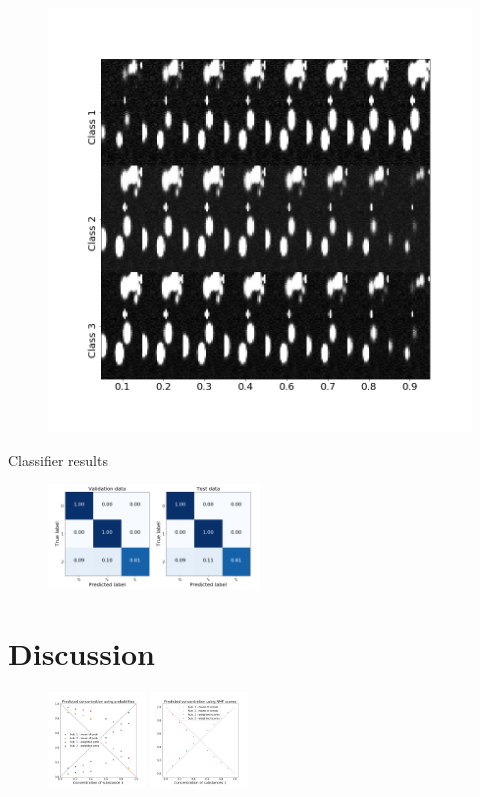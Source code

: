 \documentclass{article}
\begin{document}
\begin{figure}
  \includegraphics[width=1\linewidth]{figures_2/DNN_sigmoid_im.png}  
\end{figure}

Classifier results


\begin{figure}
  
  \includegraphics[width=0.5\textwidth]{figures_2/raman_sim_3_conf_matrix13.png}

\end{figure}

\section{Discussion}
\label{sec:discussion}


\begin{figure}
  \includegraphics[width=0.23\textwidth]{figures_2/DNN_pred_conc_prob.png}
  \includegraphics[width=0.23\textwidth]{figures_2/nmf_pred_conc.png}
\end{figure}
\end{document}

